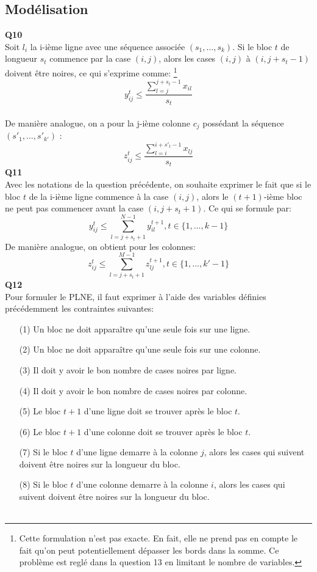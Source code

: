 \documentclass[10pt,a4paper]{article}
\begin{document}
\subsection{Modélisation}
\noindent
\textbf{Q10} \\
\noindent
Soit $l_i$ la i-ième ligne avec une séquence associée $(s_1, \hdots ,s_k)$. Si le bloc $t$ de longueur $s_t$ commence par la case $(i,j)$, alors les cases $(i,j)$ à $(i,j+s_t-1)$ doivent être noires, ce qui s'exprime comme: \footnote{Cette formulation n'est pas exacte. En fait, elle ne prend pas en compte le fait qu'on peut potentiellement dépasser les bords dans la somme. Ce problème est reglé dans la question 13 en limitant le nombre de variables.} 
 $$ y_{ij}^{t} \leq \frac{\sum_{l = j}^{j+s_t-1} x_{il}}{s_t}$$\\ 
\noindent
De manière analogue, on a pour la j-ième colonne $c_j$ possédant la séquence $(s'_{1}, \hdots , s'_{k'})$ : 
$$ z_{ij}^{t} \leq \frac{\sum_{l = i}^{i+s'_t-1} x_{lj}}{s_t}$$
\textbf{Q11} \\
Avec les notations de la question précédente, on souhaite exprimer le fait que si le bloc $t$ de la i-ième ligne commence à la case $(i,j)$, alors le $(t+1)$-ième bloc ne peut pas commencer avant la case $(i, j+ s_t +1)$. Ce qui se formule par: 
$$ y_{ij}^t \leq \sum_{l = j+s_t+1}^{N-1} y_{il}^{t+1} , t \in \lbrace 1, \hdots, k-1 \rbrace$$
\noindent
De manière analogue, on obtient pour les colonnes: 
$$ z_{ij}^t \leq \sum_{l = j+s_t+1}^{M-1} z_{lj}^{t+1} , t \in \lbrace 1, \hdots, k'-1 \rbrace$$
\textbf{Q12} \\ 
\noindent
Pour formuler le PLNE, il faut exprimer à l'aide des variables définies précédemment les contraintes suivantes: \\
\begin{itemize}
\item[(1)] Un bloc ne doit apparaître qu'une seule fois sur une ligne.
\item[(2)] Un bloc ne doit apparaître qu'une seule fois sur une colonne.
\item[(3)] Il doit y avoir le bon nombre de cases noires par ligne.
\item[(4)] Il doit y avoir le bon nombre de cases noires par colonne.
\item[(5)] Le bloc $t+1$ d'une ligne doit se trouver après le bloc $t$.
\item[(6)] Le bloc $t+1$ d'une colonne doit se trouver après le bloc $t$.
\item[(7)] Si le bloc $t$ d'une ligne demarre à la colonne $j$, alors les cases qui suivent doivent être noires sur la longueur du bloc.
\item[(8)] Si le bloc $t$ d'une colonne demarre à la colonne $i$, alors les cases qui suivent doivent être noires sur la longueur du bloc. \\ \\    
\end{itemize} 
\end{document}
